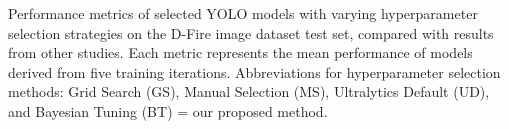 \begin{table}[hbtp]
  \caption{Performance metrics of selected YOLO models with varying hyperparameter selection strategies on the D-Fire image dataset test set, compared with results from other studies. Each metric represents the mean performance of models derived from five training iterations. Abbreviations for hyperparameter selection methods: Grid Search (GS), Manual Selection (MS), Ultralytics Default (UD), and Bayesian Tuning (BT) = our proposed method.}\label{tb:train_results}
  \centering
\end{table}
